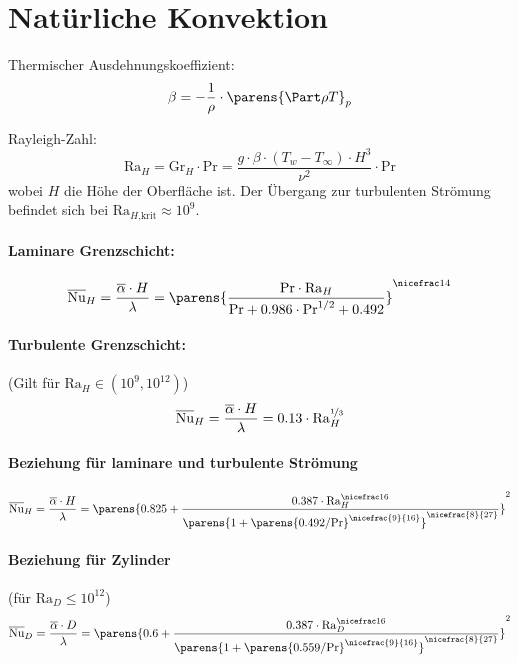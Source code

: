 
\section{Natürliche Konvektion} %
	Thermischer Ausdehnungskoeffizient:
	\[
		\beta = - \frac 1 \rho \cdot \parens{ \Part \rho T }_p
	\]

	Rayleigh-Zahl:
	\[
		\mathrm{Ra}_H = \mathrm{Gr}_H \cdot \mathrm{Pr} = \frac{g \cdot \beta \cdot (T_w - T_\infty) \cdot H^3}{\nu^2} \cdot \mathrm{Pr}
	\]
	wobei $H$ die Höhe der Oberfläche ist. Der Übergang zur turbulenten Strömung befindet sich bei $\mathrm{Ra}_{H\text{,krit}} \approx 10^9$.

	\paragraph{Laminare Grenzschicht:} %
		\[
			\overline{\mathrm{Nu}}_H = \frac{\overline{\alpha} \cdot H}{\lambda} =
			\parens{\frac{\mathrm{Pr} \cdot \mathrm{Ra}_H}{\mathrm{Pr} + 0.986 \cdot \mathrm{Pr}^{1/2} + 0.492}}^{\nicefrac 1 4}
		\]

	\paragraph{Turbulente Grenzschicht:} %
		(Gilt für $\mathrm{Ra}_H \in (10^9,10^{12})$)
		\[
			\overline{\mathrm{Nu}}_H = \frac{\overline{\alpha} \cdot H}{\lambda} =
			0.13 \cdot \mathrm{Ra}_H^{\nicefrac 1 3}
		\]

	\paragraph{Beziehung für laminare und turbulente Strömung} %
		\[
			\overline{\mathrm{Nu}}_H = \frac{\overline{\alpha} \cdot H}{\lambda} = \parens{0.825 + \frac{0.387 \cdot \mathrm{Ra}_H^{\nicefrac 1 6}}{\parens{1 + \parens{0.492 / \mathrm{Pr}}^{\nicefrac{9}{16}}}^{\nicefrac{8}{27}}}}^2
		\]

	\paragraph{Beziehung für Zylinder} %
		(für $\mathrm{Ra}_D \leq 10^{12}$)
		\[
			\overline{\mathrm{Nu}}_D = \frac{\overline{\alpha} \cdot D}{\lambda} = \parens{0.6 + \frac{0.387 \cdot \mathrm{Ra}_D^{\nicefrac 1 6}}{\parens{1 + \parens{0.559 / \mathrm{Pr}}^{\nicefrac{9}{16}}}^{\nicefrac{8}{27}}}}^2
		\]

